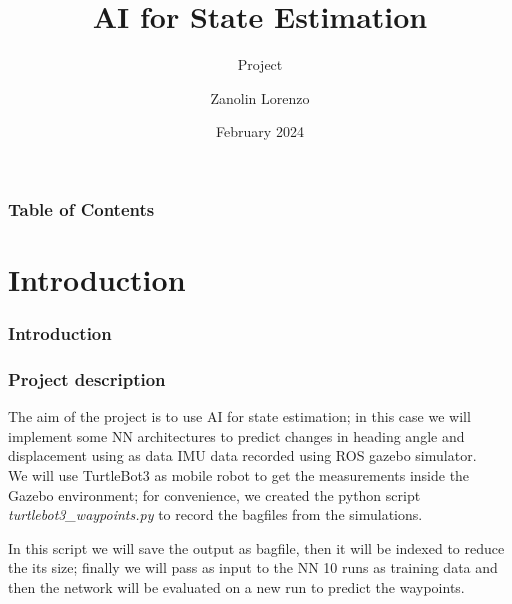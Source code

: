 \documentclass[aspectratio=169,t,xcolor=table]{beamer}
\begin{document}
\title[Inf UFG]{AI for State Estimation}
\subtitle{Project}

\author{Zanolin Lorenzo}

\date{February 2024}
\frame[noframenumbering]{\titlepage}


\begin{frame}
    \frametitle{Table of Contents}
    \tableofcontents
\end{frame}

\section{Introduction}

\begin{frame}{}
    \frametitle{Introduction}
\end{frame}

\begin{frame}
    \frametitle{Project description}
    The aim of the project is to use AI for state estimation; in this case we will implement some NN architectures to predict changes in heading angle and displacement using as data IMU data recorded using ROS gazebo simulator.\\
    \vspace{5mm}
    We will use TurtleBot3 as mobile robot to get the measurements inside the Gazebo environment; for convenience, we created the python script \textit{turtlebot3\_waypoints.py} to record the bagfiles from the simulations.\\
    \vspace{5mm} 

In this script we will save the output as bagfile, then it will be indexed to reduce the its size; finally we will pass as input to the NN 10 runs as training data and then the network will be evaluated on a new run to predict the waypoints.
\end{frame}
\end{document}
